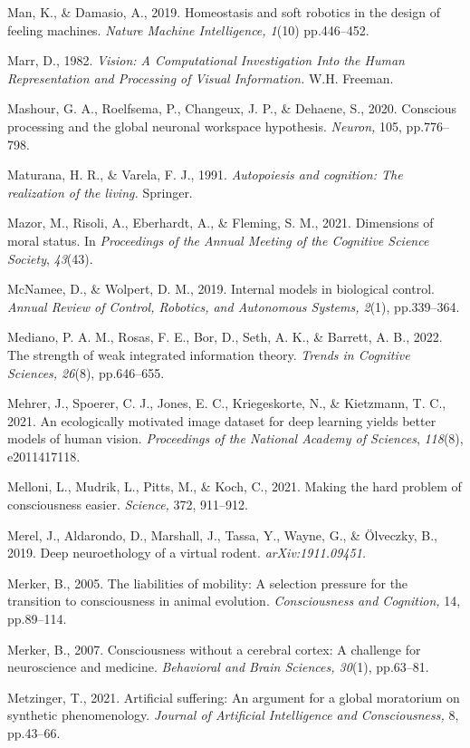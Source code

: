 \documentclass[12pt]{article}
\begin{document}
Man, K., \& Damasio, A., 2019. Homeostasis and soft robotics in the design of feeling machines. \textit{Nature Machine Intelligence, 1}(10) pp.446–452. 

Marr, D., 1982. \emph{Vision: A Computational Investigation Into the
Human Representation and Processing of Visual Information.} W.H.
Freeman.

Mashour, G. A., Roelfsema, P., Changeux, J. P., \& Dehaene, S., 2020.
Conscious processing and the global neuronal workspace hypothesis.
\emph{Neuron,} 105, pp.776--798.

Maturana, H. R., \& Varela, F. J., 1991. \emph{Autopoiesis and
cognition: The realization of the living.} Springer.

Mazor, M., Risoli, A., Eberhardt, A., \& Fleming, S. M., 2021.
Dimensions of moral status. In \emph{Proceedings of the Annual Meeting
of the Cognitive Science Society}, \emph{43}(43).

McNamee, D., \& Wolpert, D. M., 2019. Internal models in biological
control. \emph{Annual Review of Control, Robotics, and Autonomous
Systems, 2}(1), pp.339--364.

Mediano, P. A. M., Rosas, F. E., Bor, D., Seth, A. K., \& Barrett, A.
B., 2022. The strength of weak integrated information theory.
\emph{Trends in Cognitive Sciences, 26}(8), pp.646--655.

Mehrer, J., Spoerer, C. J., Jones, E. C., Kriegeskorte, N., \&
Kietzmann, T. C., 2021. An ecologically motivated image dataset for deep
learning yields better models of human vision. \emph{Proceedings of the
National Academy of Sciences}, \emph{118}(8), e2011417118.

Melloni, L., Mudrik, L., Pitts, M., \& Koch, C., 2021. Making the hard
problem of consciousness easier. \emph{Science,} 372, 911--912.

Merel, J., Aldarondo, D., Marshall, J., Tassa, Y., Wayne, G., \&
Ölveczky, B., 2019. Deep neuroethology of a virtual rodent.
\emph{arXiv:1911.09451.}

Merker, B., 2005. The liabilities of mobility: A selection pressure for
the transition to consciousness in animal evolution. \emph{Consciousness
and Cognition,} 14, pp.89--114.

Merker, B., 2007. Consciousness without a cerebral cortex: A challenge
for neuroscience and medicine. \emph{Behavioral and Brain Sciences,
30}(1), pp.63--81.

Metzinger, T., 2021. Artificial suffering: An argument for a global
moratorium on synthetic phenomenology. \emph{Journal of Artificial
Intelligence and Consciousness,} 8, pp.43--66.
\end{document}
